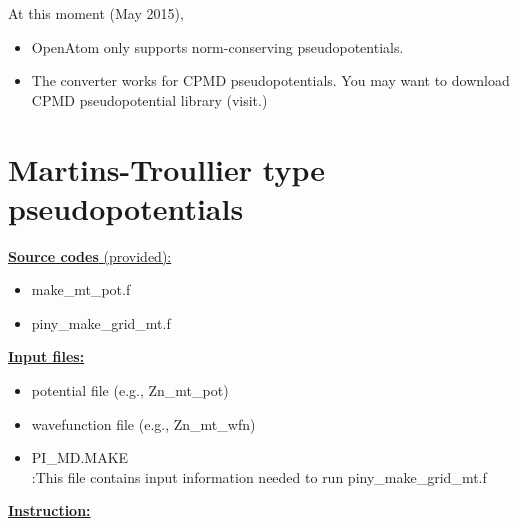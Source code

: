 \documentclass[letterpaper,12pt]{article}
\title{\fontfamily{phv}\selectfont{Converting pseudopotentials for OpenAtom}}
\date{}
\begin{document}
\maketitle

At this moment (May 2015),
\begin{itemize}
\item OpenAtom only supports norm-conserving pseudopotentials.
\item The converter works for CPMD pseudopotentials. You may want to download CPMD pseudopotential library (visit{\selectfont{ http://cpmd.org/download}}.)
\end{itemize}


\section{Martins-Troullier type pseudopotentials}


\noindent
\underline{ {\bf Source codes }(provided): }
	\begin{itemize}
	\item make{\_}mt{\_}pot.f
	\item piny{\_}make{\_}grid{\_}mt.f
	\end{itemize}
	
\vskip 12pt
\noindent
\underline{ {\bf Input files:} }
	\begin{itemize}
	\item potential file (e.g., Zn{\_}mt{\_}pot)
	\item wavefunction file (e.g., Zn{\_}mt{\_}wfn)
	\item PI{\_}MD.MAKE\\:This file contains input information needed to run piny{\_}make{\_}grid{\_}mt.f
	\end{itemize}

\vskip 12pt
\noindent
\underline{ {\bf Instruction:} }
\end{document}

